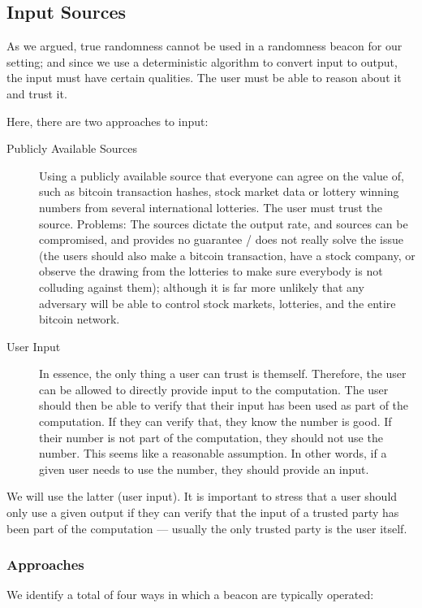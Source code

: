 \subsection{Input Sources}
As we argued, true randomness cannot be used in a randomness beacon for our setting;
and since we use a deterministic algorithm to convert input to output, the input must have certain qualities.
The user must be able to reason about it and trust it.

Here, there are two approaches to input:

\begin{description}
    \item[Publicly Available Sources] Using a publicly available source that everyone can agree on the value of, such as bitcoin transaction hashes, stock market data or lottery winning numbers from several international lotteries.
The user must trust the source.
Problems: The sources dictate the output rate, and sources can be compromised, and provides no guarantee / does not really solve the issue (the users should also make a bitcoin transaction, have a stock company, or observe the drawing from the lotteries to make sure everybody is not colluding against them); although it is far more unlikely that any adversary will be able to control stock markets, lotteries, and the entire bitcoin network.

    \item[User Input] In essence, the only thing a user can trust is themself.
Therefore, the user can be allowed to directly provide input to the computation.
The user should then be able to verify that their input has been used as part of the computation.
If they can verify that, they know the number is good.
If their number is not part of the computation, they should not use the number.
This seems like a reasonable assumption.
In other words, if a given user needs to use the number, they should provide an input.
\end{description}

We will use the latter (user input).
It is important to stress that a user should only use a given output if they can verify that the input of a trusted party has been part of the computation --- usually the only trusted party is the user itself.

\subsubsection{Approaches}
We identify a total of four ways in which a beacon are typically operated:

